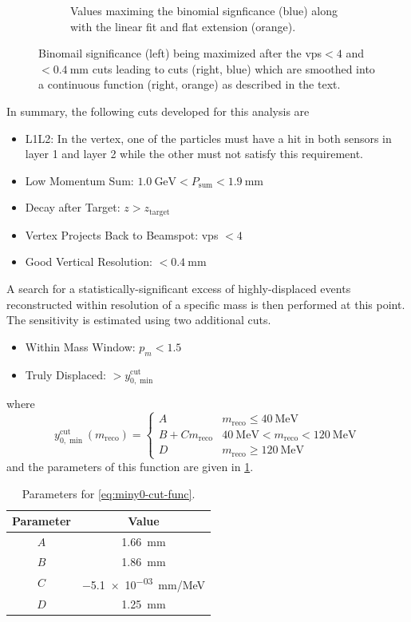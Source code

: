 \begin{figure}
\begin{subfigure}{0.48\textwidth}
    \caption{%
      Values maximing the binomial signficance (blue) along with the linear fit and flat extension (orange).
    }
    \label{fig:miny0-opt:fit}
  \end{subfigure}
  \caption{%
    Binomail significance (left) being maximized after the \ac{vps}$< 4$ and
    \maxyzeroerr$<\qty{0.4}{\mm}$ cuts leading to cuts (right, blue) which are
    smoothed into a continuous function (right, orange) as described in the text.
  }
  \label{fig:miny0-opt}
\end{figure}

In summary, the following cuts developed for this analysis are
\begin{itemize}
  \item L1L2: In the vertex, one of the particles must have a hit in both sensors in
    layer 1 and layer 2 while the other must not satisfy this requirement.
  \item Low Momentum Sum: $\qty{1.0}{\GeV} < P_\mathrm{sum} < \qty{1.9}{\mm}$
  \item Decay after Target: $z > z_\mathrm{target}$
  \item Vertex Projects Back to Beamspot: \ac{vps} $< 4$
  \item Good Vertical Resolution: \maxyzeroerr$< \qty{0.4}{\mm}$
\end{itemize}
A search for a statistically-significant excess of highly-displaced events
reconstructed within resolution of a specific mass is then performed at this point.
The sensitivity is estimated using two additional cuts.
\begin{itemize}
  \item Within Mass Window: $p_m < 1.5$
  \item Truly Displaced: \minyzero$> y_{0,\min}^\mathrm{cut}$
\end{itemize}
where
\begin{equation} \label{eq:miny0-cut-func}
  y_{0,\min}^\mathrm{cut}(m_\mathrm{reco}) = \begin{cases}
    A & m_\mathrm{reco} \leq \qty{40}{\MeV} \\
    B+Cm_\mathrm{reco} & \qty{40}{\MeV} < m_\mathrm{reco} < \qty{120}{\MeV} \\
    D & m_\mathrm{reco} \geq \qty{120}{\MeV} 
  \end{cases}
\end{equation}
and the parameters of this function are given in \cref{tab:miny0-cut-params}.

\begin{table}
  \centering
  \begin{tabular}{c|c}
    Parameter & Value \\ \hline
    $A$ & \qty{1.66}{\mm} \\
    $B$ & \qty{1.86}{\mm} \\
    $C$ & \qty{-5.1e-03}{\mm/\MeV} \\
    $D$ & \qty{1.25}{\mm}
  \end{tabular}
  \caption{Parameters for \cref{eq:miny0-cut-func}.}
  \label{tab:miny0-cut-params}
\end{table}

